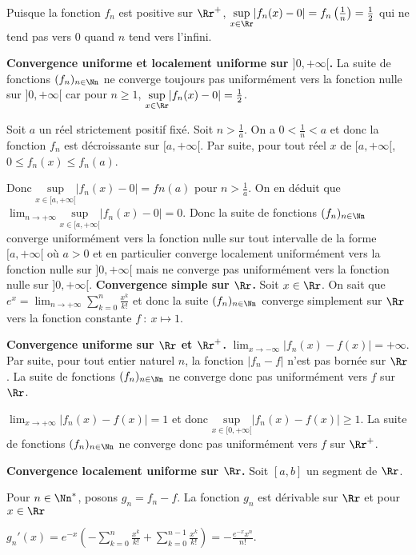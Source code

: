 {{Puisque la fonction $f_n$ est positive sur $\Rr^+$,  $\underset{x\in\Rr}{\text{sup}}|f_n(x) - 0|= f_n\left(\frac{1}{n}\right)=\frac{1}{2}$ qui ne tend pas vers $0$ quand $n$ tend vers l'infini.

\textbf{Convergence uniforme et localement uniforme sur $]0,+\infty[$.}
La suite de fonctions $(f_n)_{n\in\Nn}$ ne converge toujours pas uniformément vers la fonction nulle sur $]0,+\infty[$ car pour $n\geqslant1$, $\underset{x\in\Rr}{\text{sup}}|f_n(x) - 0|=\frac{1}{2}$.

 
Soit $a$ un réel strictement positif fixé. Soit $n>\frac{1}{a}$. On a $0<\frac{1}{n}<a$ et donc  la fonction $f_n$ est décroissante sur $[a,+\infty[$. Par suite, pour tout réel $x$ de $[a,+\infty[$, $0\leqslant f_n(x)\leqslant f_n(a)$.

Donc $\underset{x\in[a,+\infty[}{\text{sup}}|f_n(x) - 0|= fn(a)$ pour $n>\frac{1}{a}$. On en déduit que  $\lim_{n \rightarrow +\infty}\underset{x\in[a,+\infty[}{\text{sup}}|f_n(x) - 0|=0$.
Donc la suite de fonctions $(f_n)_{n\in\Nn}$ converge uniformément vers la fonction nulle sur tout intervalle de la forme $[a,+\infty[$ où $a > 0$ et en particulier converge localement uniformément vers la fonction nulle sur $]0,+\infty[$ mais ne converge pas uniformément vers la fonction nulle sur $]0,+\infty[$.
\textbf{Convergence simple sur $\Rr$.} Soit $x\in\Rr$. On sait que $e^x =\lim_{n \rightarrow +\infty}\sum_{k=0}^{n}\frac{x^k}{k!}$ et donc la suite $(f_n)_{n\in\Nn}$ converge simplement sur $\Rr$ vers la fonction constante $f~:~x\mapsto1$.

\textbf{Convergence uniforme sur $\Rr$ et $\Rr^+$.} $\lim_{x \rightarrow -\infty}|f_n(x)-f(x)| = +\infty$. Par suite, pour tout entier naturel $n$, la fonction $|f_n-f|$ n'est pas bornée sur $\Rr$. La suite de fonctions $(f_n)_{n\in\Nn}$ ne converge donc pas uniformément vers $f$ sur $\Rr$.

$\lim_{x \rightarrow +\infty}|f_n(x)-f(x)| = 1$ et donc $\underset{x\in[0,+\infty[}{\text{sup}}|f_n(x)-f(x)|\geqslant1$. La suite de fonctions $(f_n)_{n\in\Nn}$ ne converge donc pas uniformément vers $f$ sur $\Rr^+$.

\textbf{Convergence localement uniforme sur $\Rr$.} Soit $[a,b]$ un segment de $\Rr$.

 
Pour $n\in\Nn^*$, posons $g_n= f_n- f$. La fonction $g_n$ est dérivable sur $\Rr$ et pour $x\in\Rr$

\begin{center}
$g_n'(x)=e^{-x}\left(-\sum_{k=0}^{n}\frac{x^k}{k!}+\sum_{k=0}^{n-1}\frac{x^k}{k!}\right)=-\frac{e^{-x}x^n}{n!}$.
\end{center}

}}
